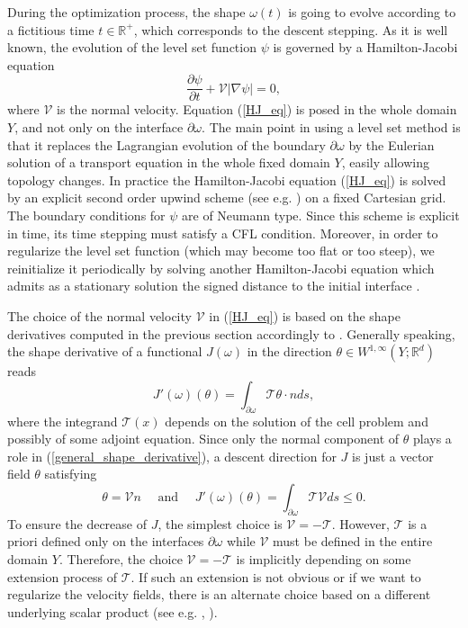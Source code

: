 \documentclass{article}
\def\RR{{\mathbb{R}}}
\begin{document}
During the optimization process, the shape $\omega(t)$ is going to evolve according to a fictitious time $t\in \RR^+$, which corresponds to the descent stepping. As it is well known, the evolution of the level set function $\psi$ is governed by a Hamilton-Jacobi equation 
\begin{equation}
\label{HJ_eq}
\frac{\partial \psi}{\partial t}+\mathcal{V} |\nabla \psi|=0,
\end{equation}
where $\mathcal{V}$ is the normal velocity. Equation (\ref{HJ_eq}) is posed in the whole domain $Y$, and not only on the interface $\partial \omega$. 
The main point in using a level set method is that it replaces the Lagrangian evolution of the boundary $\partial \omega$ by the Eulerian solution of a transport equation in the whole fixed
domain $Y$, easily allowing topology changes. In practice the Hamilton-Jacobi equation (\ref{HJ_eq}) is solved by an explicit second order upwind scheme (see e.g. \cite{sethian.99}) on a fixed Cartesian grid. The boundary conditions for $\psi$ are of Neumann type. Since this scheme is explicit in time, its time stepping must satisfy a CFL condition. Moreover, in order to regularize the
level set function (which may become too flat or too steep), we reinitialize it periodically by solving another Hamilton-Jacobi equation which admits as a stationary solution the signed distance to the initial interface \cite{sethian.99}.

\medskip

The choice of the normal velocity $\mathcal{V}$ in (\ref{HJ_eq}) 
is based on the shape derivatives computed in the previous section accordingly to  \cite{allaire2004structural}.
Generally speaking, the shape derivative of a functional $J(\omega)$ in 
the direction $\theta\in W^{1,\infty}(Y;\RR^d)$ reads
\begin{equation}
\label{general_shape_derivative}
J'(\omega)(\theta)=\int_{\partial \omega}\mathcal{T}\theta \cdot n ds,
\end{equation}
where the integrand $\mathcal{T}(x)$ depends on the solution of the cell problem and possibly of some adjoint equation. 
Since only the normal component of $\theta$ plays a role in (\ref{general_shape_derivative}), 
a descent direction for $J$ is just a vector field $\theta$ 
satisfying
\begin{equation}
\theta = \mathcal{V} n \quad \mbox{ and } \quad 
J'(\omega)(\theta)=\int_{\partial \omega}\mathcal{T} \mathcal{V} ds\leq 0.
\end{equation}
To ensure the decrease of $J$, the simplest choice is $\mathcal{V}=-\mathcal{T}$. 
However, $\mathcal{T}$ is a priori defined only on the interfaces $\partial \omega$ 
while $\mathcal{V}$ must be defined in the entire domain $Y$. Therefore, the 
choice $\mathcal{V}=-\mathcal{T}$ is implicitly depending on some extension 
process of $\mathcal{T}$. If such an extension is not obvious or if 
we want to regularize the velocity fields, there is an alternate choice 
based on a different underlying scalar product (see e.g. 
\cite{allaire2004structural}, \cite{MR2225309}). \\
\end{document}
